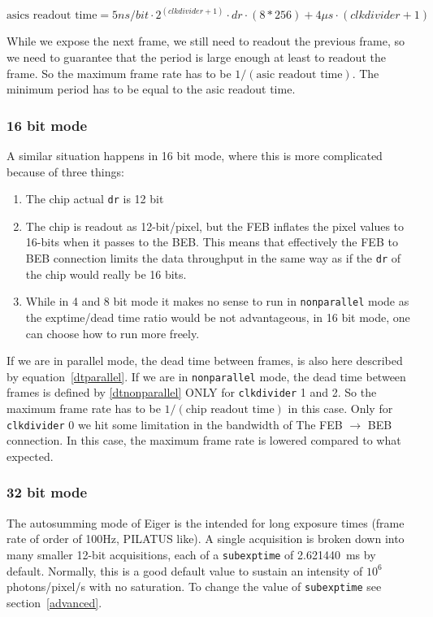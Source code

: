 \documentclass{article}
\begin{document}
\begin{equation}\label{dtnonparallel}
\textrm{asics readout time} = 5ns/bit \cdot 2^{(clkdivider+1)} \cdot dr \cdot (8*256) + 4 \mu s \cdot (clkdivider+1)
\end{equation}

While we expose the next frame, we still need to readout the previous frame, so we need to guarantee that the period is large enough at least to readout the frame. So the maximum frame rate has to be $1/(\textrm{asic readout time})$. The minimum period has to be equal to the asic readout time. 

\subsubsection{16 bit mode}

A similar situation happens in 16 bit mode, where this is more complicated because of three things:
\begin{enumerate}
\item The chip actual {\tt{dr}} is 12 bit
\item The chip is readout as 12-bit/pixel, but the FEB inflates the pixel values to 16-bits when it passes to the BEB. This means that effectively the FEB to BEB connection limits the data throughput in the same way as if the {\tt{dr}} of the chip would really be 16 bits.
\item While in 4 and 8 bit mode it makes no sense to run in {\tt{nonparallel}} mode as the exptime/dead time ratio would be not advantageous, in 16 bit mode, one can choose how to run more freely.
\end{enumerate}

If we are in parallel mode, the dead time between frames, is also here described by equation~\ref{dtparallel}. If we are in {\tt{nonparallel}} mode, the dead time between frames is defined by \ref{dtnonparallel} ONLY for {\tt{clkdivider}} 1 and 2. So the maximum frame rate has to be $1/(\textrm{chip readout time})$ in this case. Only for {\tt{clkdivider}} 0 we hit some limitation in the bandwidth of The FEB $\to$ BEB connection. In this case, the maximum frame rate is lowered compared to what expected.

\subsubsection{32 bit mode}
The autosumming mode of Eiger is the intended for long exposure times (frame rate of order of 100Hz, PILATUS like). A single acquisition is broken down into many smaller 12-bit acquisitions, each of a {\tt{subexptime}} of 2.621440~ms by default. Normally, this is a good default value to sustain an intensity of $10^6$ photons/pixel/s with no saturation. To change the value of {\tt{subexptime}} see section~\ref{advanced}. 
\end{document}
